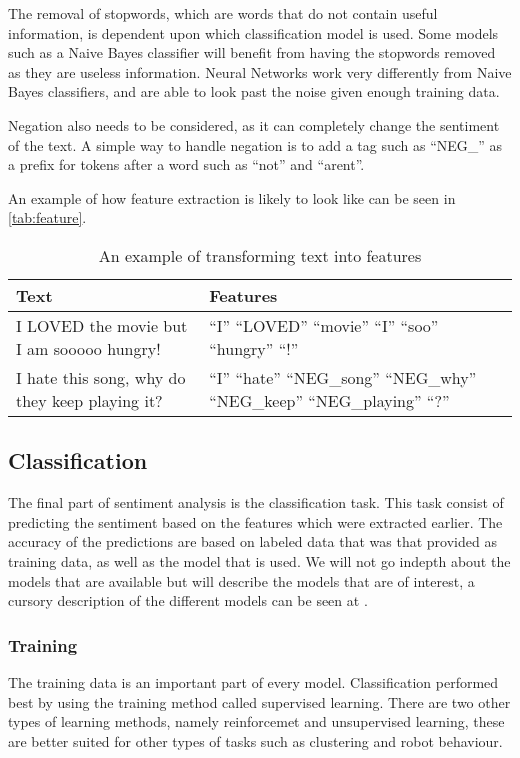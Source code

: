 The removal of stopwords, which are words that do not contain useful
information, is dependent upon which classification model is used. Some models
such as a Naive Bayes classifier will benefit from having the stopwords removed
as they are useless information. Neural Networks work very differently from
Naive Bayes classifiers, and are able to look past the noise given enough
training data.\nl

Negation also needs to be considered, as it can completely change the sentiment
of the text. A simple way to handle negation is to add a tag such as ``NEG\_'' as
a prefix for tokens after a word such as ``not'' and ``arent''.\nl 

An example of how feature extraction is likely to look like can be seen in
\autoref{tab:feature}.

\begin{table}[H]
\centering
\begin{tabular}{|p{6cm}|p{8cm}|}
\hline
Text & Features \\ \hline
I LOVED the movie but I am sooooo hungry! & 
``I'' ``LOVED'' ``movie'' ``I'' ``soo'' ``hungry'' ``!''
\\ \hline 
I hate this song, why do they keep playing it? &
``I'' ``hate'' ``NEG\_song'' ``NEG\_why'' ``NEG\_keep'' ``NEG\_playing'' ``?''  
\\ \hline
\end{tabular}
\caption{An example of transforming text into features}
\label{tab:feature}
\end{table}


\subsection{Classification}

The final part of sentiment analysis is the classification task. This task
consist of predicting the sentiment based on the features which were extracted
earlier. The accuracy of the predictions are based on labeled data that was that
provided as training data, as well as the model that is used. We will not go
indepth about the models that are available but will describe the models that
are of interest, a cursory description of the different models can be seen at
\citep{Classification}.

\subsubsection{Training}
The training data is an important part of every model. Classification
performed best by using the training method called supervised learning.
There are two other types of learning methods, namely reinforcemet and
unsupervised learning, these are better suited for other types of tasks such as
clustering and robot behaviour.

